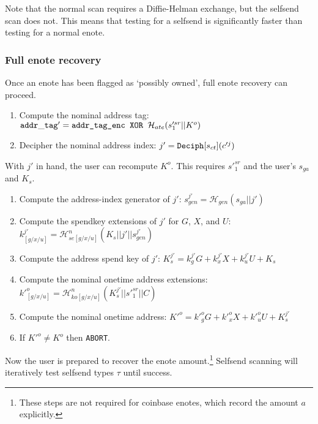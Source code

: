 Note that the normal scan requires a Diffie-Helman exchange, but the selfsend scan does not. This means that testing for a selfsend is significantly faster than testing for a normal enote.

\subsubsection{Full enote recovery}
\label{subsubsec:jamtis-balance-recovery-enote}

Once an enote has been flagged as `possibly owned’, full enote recovery can proceed.

\begin{enumerate}
    \item Compute the nominal address tag: ${\tt addr\_tag}' = \textrm{\tt addr\_tag\_enc XOR } \mathcal{H}_{ate}(s'^{sr}_1 || K^o)$

    \item Decipher the nominal address index: $j' = {\tt Deciph}[s_{ct}](c'^j)$
\end{enumerate}

With $j'$ in hand, the user can recompute $K^o$. This requires $s'^{sr}_1$ and the user's $s_{ga}$ and $K_s$.

\begin{enumerate}
    \item Compute the address-index generator of $j'$: $s^{j'}_{gen} =  \mathcal{H}_{gen}(s_{ga} || j')$

    \item Compute the spendkey extensions of $j'$ for $G$, $X$, and $U$: $k^{j'}_{[g/x/u]} = \mathcal{H}^n_{se[g/x/u]}(K_s || j' || s^{j'}_{gen})$

    \item Compute the address spend key of $j'$: $K^{j'}_s = k^{j'}_g G + k^{j'}_x X + k^{j'}_u U + K_s$

    \item Compute the nominal onetime address extensions: $k'^o_{[g/x/u]} = \mathcal{H}^n_{ko[g/x/u]}(K^{j'}_s || s'^{sr}_1 || C)$

    \item Compute the nominal onetime address: $K'^o = k'^o_g G + k'^o_x X + k'^o_u U + K^{j'}_s$

    \item If $K'^o \neq K^o$ then {\tt ABORT}.
\end{enumerate}

Now the user is prepared to recover the enote amount.\footnote{These steps are not required for coinbase enotes, which record the amount $a$ explicitly.} Selfsend scanning will iteratively test selfsend types $\tau$ until success.

